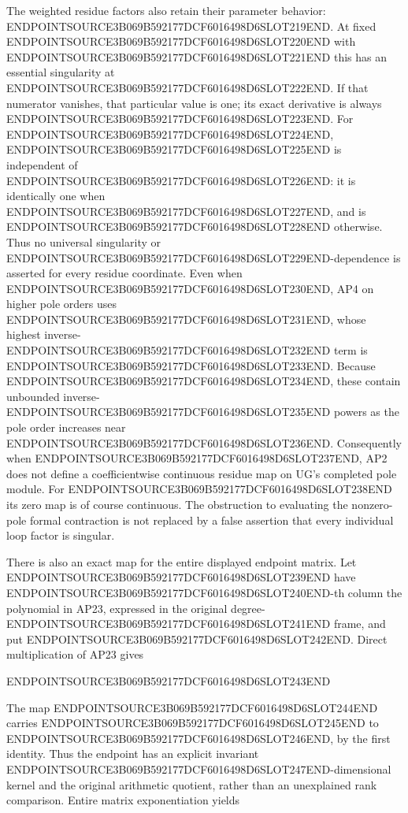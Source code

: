 The weighted residue factors also retain their parameter behavior: ENDPOINTSOURCE3B069B592177DCF6016498D6SLOT219END. At fixed ENDPOINTSOURCE3B069B592177DCF6016498D6SLOT220END with ENDPOINTSOURCE3B069B592177DCF6016498D6SLOT221END this has an essential singularity at ENDPOINTSOURCE3B069B592177DCF6016498D6SLOT222END. If that numerator vanishes, that particular value is one; its exact derivative is always ENDPOINTSOURCE3B069B592177DCF6016498D6SLOT223END. For ENDPOINTSOURCE3B069B592177DCF6016498D6SLOT224END, ENDPOINTSOURCE3B069B592177DCF6016498D6SLOT225END is independent of ENDPOINTSOURCE3B069B592177DCF6016498D6SLOT226END: it is identically one when ENDPOINTSOURCE3B069B592177DCF6016498D6SLOT227END, and is ENDPOINTSOURCE3B069B592177DCF6016498D6SLOT228END otherwise. Thus no universal singularity or ENDPOINTSOURCE3B069B592177DCF6016498D6SLOT229END-dependence is asserted for every residue coordinate. Even when ENDPOINTSOURCE3B069B592177DCF6016498D6SLOT230END, AP4 on higher pole orders uses ENDPOINTSOURCE3B069B592177DCF6016498D6SLOT231END, whose highest inverse-ENDPOINTSOURCE3B069B592177DCF6016498D6SLOT232END term is ENDPOINTSOURCE3B069B592177DCF6016498D6SLOT233END. Because ENDPOINTSOURCE3B069B592177DCF6016498D6SLOT234END, these contain unbounded inverse-ENDPOINTSOURCE3B069B592177DCF6016498D6SLOT235END powers as the pole order increases near ENDPOINTSOURCE3B069B592177DCF6016498D6SLOT236END. Consequently when ENDPOINTSOURCE3B069B592177DCF6016498D6SLOT237END, AP2 does not define a coefficientwise continuous residue map on UG's completed pole module. For ENDPOINTSOURCE3B069B592177DCF6016498D6SLOT238END its zero map is of course continuous. The obstruction to evaluating the nonzero-pole formal contraction is not replaced by a false assertion that every individual loop factor is singular.

There is also an exact map for the entire displayed endpoint matrix. Let ENDPOINTSOURCE3B069B592177DCF6016498D6SLOT239END have ENDPOINTSOURCE3B069B592177DCF6016498D6SLOT240END-th column the polynomial in AP23, expressed in the original degree-ENDPOINTSOURCE3B069B592177DCF6016498D6SLOT241END frame, and put ENDPOINTSOURCE3B069B592177DCF6016498D6SLOT242END. Direct multiplication of AP23 gives

ENDPOINTSOURCE3B069B592177DCF6016498D6SLOT243END

The map ENDPOINTSOURCE3B069B592177DCF6016498D6SLOT244END carries ENDPOINTSOURCE3B069B592177DCF6016498D6SLOT245END to ENDPOINTSOURCE3B069B592177DCF6016498D6SLOT246END, by the first identity. Thus the endpoint has an explicit invariant ENDPOINTSOURCE3B069B592177DCF6016498D6SLOT247END-dimensional kernel and the original arithmetic quotient, rather than an unexplained rank comparison. Entire matrix exponentiation yields

